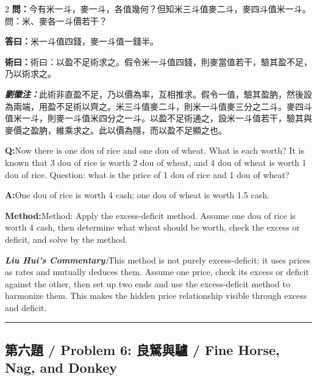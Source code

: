 \documentclass[11pt,a4paper]{article}
\newcommand{\cnwen}{\textcolor{cnlabelfg}{\textbf{問：}}}
\newcommand{\cnda}{\textbf{答曰：}}
\newcommand{\cnshu}{\textcolor{cnlabelfg}{\textbf{術曰：}}}
\newcommand{\cnzhu}{\textcolor{commentarycolor}{\textit{\textbf{劉徽注：}}}}
\newcommand{\enwen}{\textcolor{enlabelfg}{\textbf{Q:}}}
\newcommand{\enda}{\textcolor{enlabelfg}{\textbf{A:}}}
\newcommand{\enshu}{\textcolor{enlabelfg}{\textbf{Method:}}}
\newcommand{\enzhu}{\textcolor{enlabelfg}{\textit{\textbf{Liu Hui's Commentary:}}}}
\begin{document}
\begin{paracol}{2}
\switchcolumn[0]
\cnwen 今有米一斗，麥一斗，各值幾何？但知米三斗值麥二斗，麥四斗值米一斗。問：米、麥各一斗價若干？

\cnda 米一斗值四錢，麥一斗值一錢半。

\cnshu 術曰：以盈不足術求之。假令米一斗值四錢，則麥當值若干，驗其盈不足，乃以術求之。

\cnzhu 此術非直盈不足，乃以價為率，互相推求。假令一值，驗其盈肭，然後設為兩端，用盈不足術以齊之。米三斗值麥二斗，則米一斗值麥三分之二斗。麥四斗值米一斗，則麥一斗值米四分之一斗。以盈不足術通之，設米一斗值若干，驗其與麥價之盈肭，維乘求之。此以價為隱，而以盈不足顯之也。

\switchcolumn[1]
\enwen Now there is one dou of rice and one dou of wheat. What is each worth? It is known that 3 dou of rice is worth 2 dou of wheat, and 4 dou of wheat is worth 1 dou of rice. Question: what is the price of 1 dou of rice and 1 dou of wheat?

\enda One dou of rice is worth 4 cash; one dou of wheat is worth 1.5 cash.

\enshu Method: Apply the excess-deficit method. Assume one dou of rice is worth 4 cash, then determine what wheat should be worth, check the excess or deficit, and solve by the method.

\enzhu This method is not purely excess-deficit; it uses prices as rates and mutually deduces them. Assume one price, check its excess or deficit against the other, then set up two ends and use the excess-deficit method to harmonize them. This makes the hidden price relationship visible through excess and deficit.
\end{paracol}

\bigskip\hrule\bigskip

\subsection{第六題 / Problem 6: 良駑與驢 / Fine Horse, Nag, and Donkey}
\end{document}
